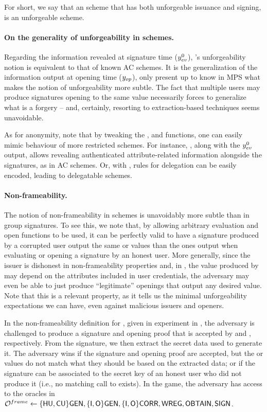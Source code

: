 For short, we say that an \UAS scheme that has both unforgeable issuance and
signing, is an unforgeable \UAS scheme.

\paragraph{On the generality of unforgeability in \UAS schemes.} %
Regarding the information revealed at signature time ($y_{ev}^0$), \UAS's
unforgeability notion is equivalent to that of known AC schemes. It is the
generalization of the information output at opening time ($y_{op}$), only
present up to know in MPS \needcite what makes the notion of unforgeability more
subtle. The fact that multiple users may produce signatures opening to the same
value necessarily forces to generalize what is a forgery -- and, certainly,
resorting to extraction-based techniques seems unavoidable.

As for anonymity, note that by tweaking the \fissue, \feval and \finsp
functions, one can easily mimic behaviour of more restricted schemes. For
instance, \feval, along with the $y_{ev}^0$ output, allows revealing
authenticated attribute-related information alongside the signatures, as in AC
schemes. Or, with \fissue, rules for delegation can be easily encoded, leading
to delegatable schemes.

\paragraph{Non-frameability.} %
The notion of non-frameability in \UAS schemes is unavoidably more subtle than
in group signatures. To see this, we note that, by allowing arbitrary
evaluation and open functions to be used, it can be perfectly valid to
have a signature produced by a corrupted user output the same \yeval or \yinsp
values than the ones output when evaluating or opening a signature by an honest
user.
%
More generally, since the issuer is dishonest in non-frameability properties
and, in \UAS, the value produced by \Open may depend on the attributes
included in user credentials, the adversary may even be able to just produce
``legitimate'' openings that output any desired value. Note that this is a
relevant property, as it tells us the minimal unforgeability expectations we
can have, even against malicious issuers and openers.

In the non-frameability definition for \UAS, given in experiment \ExpNonframe in
, the adversary is challenged to produce a signature
and opening proof that is accepted by \Verify and \Judge, respectively. From
the signature, we then extract the secret data used to generate it. The
adversary wins if the signature and opening proof are accepted, but the \yeval
or \yinsp values do not match what they should be based on the extracted data;
or if the signature can be associated to the secret key of an honest user who
did not produce it (i.e., no matching call to \SIGN exists). In the game, the
adversary has access to the oracles in $\mathcal{O}^{frame} \gets
\lbrace\mathsf{HU},\mathsf{CU}\rbrace\mathsf{GEN}, \lbrace\mathsf{I},\mathsf{O}\rbrace\mathsf{GEN},\lbrace\mathsf{I},\mathsf{O}\rbrace\mathsf{CORR},
\mathsf{WREG},\mathsf{OBTAIN},\mathsf{SIGN}$.

